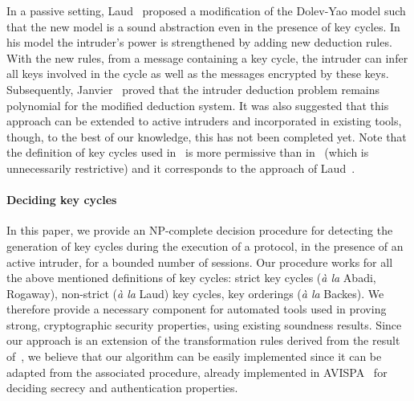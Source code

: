 \documentclass[acmtocl,acmnow]{acmtrans2m}
\newcommand{\avispa}{AVISPA}
\begin{document}
In a passive setting, Laud~\cite{Laud-NORDSEC02} proposed a
modification of the Dolev-Yao model such that the new model is a sound
abstraction even in the presence of key cycles. In his model the
intruder's power is strengthened by adding new deduction
rules. With the new rules, from a message containing a key cycle, the
intruder can infer all  keys  involved in the cycle as well as
 the messages encrypted by
these keys. Subsequently, Janvier~\cite{Janvier-these} proved that the
intruder deduction problem remains polynomial for the modified
deduction system. It was also suggested that this approach can be
extended to active intruders and incorporated in existing tools,
though, to the best of our knowledge, this has not been completed yet.  
Note that the
definition of key cycles used in~\cite{Janvier-these} is more
permissive than in~\cite{ARCryptology02} (which is unnecessarily
restrictive) and it corresponds to the approach of
Laud~\cite{Laud-NORDSEC02}.




\paragraph{Deciding key cycles} 
In this paper, we provide an NP-complete decision procedure for
detecting the generation of key cycles during the execution of a
protocol, in the presence of an active intruder, for a bounded number
of sessions.  Our procedure works for all the above mentioned
definitions of key cycles:  strict key cycles (\textit{\`a
la} Abadi, Rogaway),  non-strict (\textit{\`a la} Laud) key cycles,
key orderings (\textit{\`a la} Backes).  We therefore provide a
necessary component for automated tools used in proving strong,
cryptographic security properties, using existing soundness results.
Since our approach is an extension of the transformation rules derived
from the result of~\cite{RT01}, we believe that our algorithm can be
easily implemented since it can be adapted from the associated
procedure, already implemented in \avispa~\cite{avispa2005} for
deciding secrecy and authentication properties.
\end{document}
